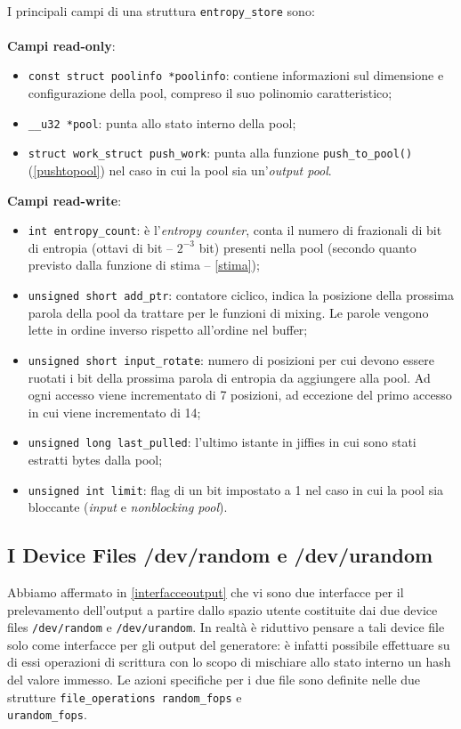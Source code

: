 \documentclass{article}
\begin{document}
 \paragraph{}I principali campi di una struttura \verb+entropy_store+ sono:\\\\
 \textbf{Campi read-only}:
 \begin{itemize}
	   \item \verb+const struct poolinfo *poolinfo+: contiene informazioni
	   sul dimensione e configurazione della pool, compreso il suo polinomio
	   caratteristico;
	   \item \verb+__u32 *pool+: punta allo stato interno della pool;
	   \item \verb+struct work_struct push_work+: punta alla funzione \verb+push_to_pool()+ 
	   (\ref{pushtopool}) nel caso in cui la pool sia un'\emph{output
	   pool}.
	 \end{itemize}
 \noindent \textbf{Campi read-write}:
 \begin{itemize}
   \item \verb+int entropy_count+: è l'\emph{entropy counter}, conta il
   numero di frazionali di bit di entropia (ottavi di 
   bit -- $2^{-3}$ bit) presenti nella pool (secondo quanto previsto dalla
   funzione di stima -- \ref{stima});
   \item \verb+unsigned short add_ptr+: contatore ciclico, indica la posizione
   della prossima parola della pool da trattare per le funzioni di mixing. 
   Le parole vengono lette in ordine inverso rispetto all'ordine nel buffer;
   \item \verb+unsigned short input_rotate+: numero di posizioni per cui devono
   essere ruotati i bit della prossima parola di entropia da aggiungere alla
   pool. Ad ogni accesso viene incrementato di 7 posizioni, ad eccezione del
   primo accesso in cui viene incrementato di 14;
   \item \verb+unsigned long last_pulled+: l'ultimo istante in jiffies in cui
   sono stati estratti bytes dalla pool;
   \item \verb+unsigned int limit+: flag di un bit impostato a 1 nel caso in
   cui la pool sia bloccante (\emph{input} e \emph{nonblocking pool}).
 \end{itemize}    
  
\subsection{I Device Files /dev/random e /dev/urandom}\label{devicefiles}
Abbiamo affermato in \ref{interfacceoutput} che vi sono due interfacce per il
prelevamento dell'output a partire dallo spazio utente costituite dai due
device files \verb+/dev/random+ e \verb+/dev/urandom+. In realtà è riduttivo
pensare a tali device file solo come interfacce per gli output del generatore: è
infatti possibile effettuare su di essi operazioni di scrittura con lo
scopo di mischiare allo stato interno un hash del valore immesso. 
\newline Le azioni specifiche per i due file sono definite nelle due
strutture \verb+file_operations random_fops+ e \\\verb+urandom_fops+.
\end{document}
